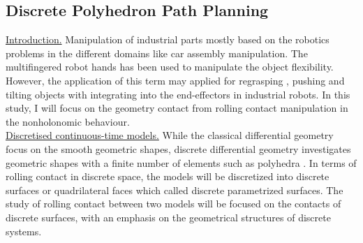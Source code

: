 
\subsection{Discrete Polyhedron Path Planning}
\noindent\uline{Introduction.} Manipulation of industrial parts mostly based on the robotics problems in the different domains like car assembly manipulation. The multifingered robot hands has been used to manipulate the object flexibility. However, the application of this term may applied for regrasping \cite{tournassoud1987regrasping, goldberg1993feeding}, pushing and tilting objects \cite{erdmann1993mechanical, peshkin1988planning} with integrating into the end-effectors in industrial robots. In this study, I will focus on the geometry contact from rolling contact manipulation in the nonholonomic behaviour.\\



\noindent\uline{Discretised continuous-time models.}
While the classical differential geometry focus on the smooth geometric shapes, discrete differential geometry investigates geometric shapes with a finite number of elements such as polyhedra \cite{Discrete_ComputationalBook}. In terms of rolling contact in discrete space, the models will be discretized into discrete surfaces or quadrilateral faces which called discrete parametrized surfaces. The study of rolling contact between two models will be focused on the contacts of discrete surfaces, with an emphasis on the geometrical structures of discrete systems.   \\



